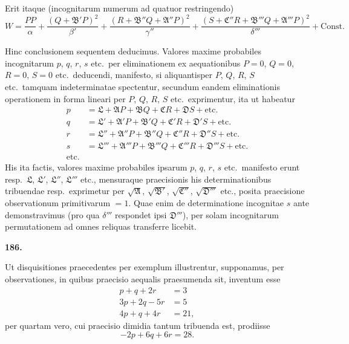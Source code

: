 \documentclass[11pt,a4paper]{article}
\begin{document}
Erit itaque (incognitarum numerum ad quatuor restringendo)
\[
W = \frac{PP}{\alpha} + \frac{(Q+\mathfrak{B}'P)^2}{\beta'} + \frac{(R+\mathfrak{B}''Q+\mathfrak{A}''P)^2}{\gamma''} + \frac{(S+\mathfrak{C}''R+\mathfrak{B}'''Q+\mathfrak{A}'''P)^2}{\delta'''} + \text{Const.}
\]

Hinc conclusionem sequentem deducimus. Valores maxime probabiles incognitarum $p$, $q$, $r$, $s$ etc.\ per eliminationem ex aequationibus $P=0$, $Q=0$, $R=0$, $S=0$ etc.\ deducendi, manifesto, si aliquantisper $P$, $Q$, $R$, $S$ etc.\ tamquam indeterminatae spectentur, secundum eandem eliminationis operationem in forma lineari per $P$, $Q$, $R$, $S$ etc.\ exprimentur, ita ut habeatur
\begin{align*}
p &= \mathfrak{L} + \mathfrak{A}P + \mathfrak{B}Q + \mathfrak{C}R + \mathfrak{D}S + \text{etc.} \\
q &= \mathfrak{L}' + \mathfrak{A}'P + \mathfrak{B}'Q + \mathfrak{C}'R + \mathfrak{D}'S + \text{etc.} \\
r &= \mathfrak{L}'' + \mathfrak{A}''P + \mathfrak{B}''Q + \mathfrak{C}''R + \mathfrak{D}''S + \text{etc.} \\
s &= \mathfrak{L}''' + \mathfrak{A}'''P + \mathfrak{B}'''Q + \mathfrak{C}'''R + \mathfrak{D}'''S + \text{etc.} \\
\text{etc.} &\qquad
\end{align*}
His ita factis, valores maxime probabiles ipsarum $p$, $q$, $r$, $s$ etc.\ manifesto erunt resp.\ $\mathfrak{L}$, $\mathfrak{L}'$, $\mathfrak{L}''$, $\mathfrak{L}'''$ etc., mensuraque praecisionis his determinationibus tribuendae resp.\ exprimetur per $\sqrt{\mathfrak{A}}$, $\sqrt{\mathfrak{B}'}$, $\sqrt{\mathfrak{C}''}$, $\sqrt{\mathfrak{D}'''}$ etc., posita praecisione observationum primitivarum $= 1$. Quae enim de determinatione incognitae $s$ ante demonstravimus (pro qua $\delta'''$ respondet ipsi $\mathfrak{D}'''$), per solam incognitarum permutationem ad omnes reliquas transferre licebit.

\newpage
\setcounter{page}{258}

\noindent\textbf{186.}

Ut disquisitiones praecedentes per exemplum illustrentur, supponamus, per observationes, in quibus praecisio aequalis praesumenda sit, inventum esse
\begin{align*}
p + q + 2r &= 3 \\
3p + 2q - 5r &= 5 \\
4p + q + 4r &= 21,
\end{align*}
per quartam vero, cui praecisio dimidia tantum tribuenda est, prodiisse
\[
-2p + 6q + 6r = 28.
\]
\end{document}
